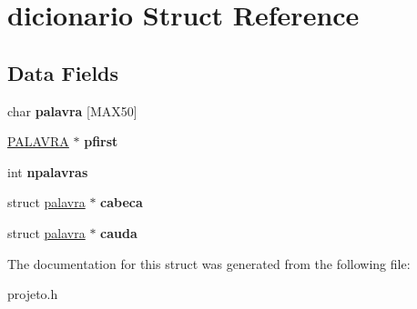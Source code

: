 \hypertarget{structdicionario}{}\section{dicionario Struct Reference}
\label{structdicionario}
\subsection*{Data Fields}
\begin{DoxyCompactItemize}
\item 
\mbox{\label{structdicionario_ac203eb6689c560004286a1aae79f6ee0}} 
char {\bfseries palavra} \mbox{[}M\+A\+X50\mbox{]}
\item 
\mbox{\label{structdicionario_a9bd01e56e3ef2f53753ec66a690a9e3c}} 
\mbox{\hyperlink{structpalavra}{P\+A\+L\+A\+V\+RA}} $\ast$ {\bfseries pfirst}
\item 
\mbox{\label{structdicionario_a0436e0c08968016a090b118d46fc1228}} 
int {\bfseries npalavras}
\item 
\mbox{\label{structdicionario_a40a66dc2b4ef7613fde48039945d2345}} 
struct \mbox{\hyperlink{structpalavra}{palavra}} $\ast$ {\bfseries cabeca}
\item 
\mbox{\label{structdicionario_ae8fd6545428992ecc752e7c7c67f6533}} 
struct \mbox{\hyperlink{structpalavra}{palavra}} $\ast$ {\bfseries cauda}
\end{DoxyCompactItemize}


The documentation for this struct was generated from the following file\+:\begin{DoxyCompactItemize}
\item 
projeto.\+h\end{DoxyCompactItemize}
